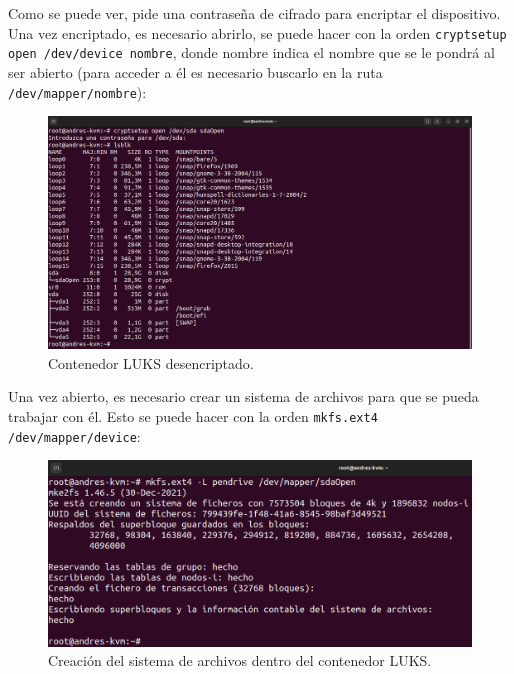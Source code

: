 \documentclass{article}
\begin{document}
\bigskip

Como se puede ver, pide una contraseña de cifrado para encriptar el dispositivo. Una vez encriptado, es necesario abrirlo, se puede hacer con la orden \verb|cryptsetup open /dev/device nombre|, donde nombre indica el nombre que se le pondrá al ser abierto (para acceder a él es necesario buscarlo en la ruta \verb|/dev/mapper/nombre|):

\begin{figure}[H]
    \includegraphics[width=\textwidth]{imagenes/Captura desde 2022-10-30 10-54-01.png}
    \caption{Contenedor LUKS desencriptado.}
\end{figure}

\newpage

Una vez abierto, es necesario crear un sistema de archivos para que se pueda trabajar con él. Esto se puede hacer con la orden \verb|mkfs.ext4 /dev/mapper/device|:

\begin{figure}[H]
    \includegraphics[width=\textwidth]{imagenes/Captura desde 2022-10-30 10-57-11.png}
    \caption{Creación del sistema de archivos dentro del contenedor LUKS.}
\end{figure}

\bigskip
\end{document}
